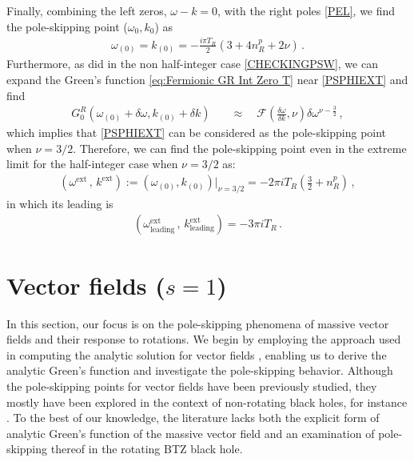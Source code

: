 \documentclass[11pt,a4paper]{article}
\begin{document}
Finally, combining the left zeros, $\omega-k=0$, with the right poles \eqref{PEL}, we find the pole-skipping point ($\omega_{0}, k_{0}$) as
\begin{align}\label{PSPHIEXT}
\omega_{(0)} = k_{(0)} = -\frac{i \pi T_R}{2} (3 + 4 n^{p}_{R} + 2\nu) \,.
\end{align}
Furthermore, as did in the non half-integer case \eqref{CHECKINGPSW}, we can expand the Green's function \eqref{eq:Fermionic GR Int Zero T} near \eqref{PSPHIEXT} and find
\begin{align}
G^R_0(\omega_{(0)} + \delta \omega, k_{(0)} + \delta k)  &\quad\approx\quad \mathcal{F}
\left(\frac{\delta \omega}{\delta k}, \nu\right)
\delta \omega^{\nu-\frac{3}{2}}  \,,
\end{align}
which implies that \eqref{PSPHIEXT} can be considered as the pole-skipping point when $\nu=3/2$.
Therefore, we can find the pole-skipping point even in the extreme limit for the half-integer case when $\nu=3/2$ as:
\begin{align}\label{answer111}
\left(\omega^{\text{ext}}\,,\, k^{\text{ext}}\right):= \left( \omega_{(0)}, k_{(0)} \right) \Big|_{\nu=3/2} = -2 \pi i T_R \left(\frac{3}{2}+n^p_R\right) \,,
\end{align}
in which its leading is 
\begin{align}\label{}
\left( \omega^{\text{ext}}_\text{leading}\,,\, k^{\text{ext}}_\text{leading} \right) = -3 \pi i T_R \,.
\end{align}









%    
\section{Vector fields ($s=1$)} \label{sec:Vector fields}
In this section, our focus is on the pole-skipping phenomena of massive vector fields and their response to rotations.
We begin by employing the approach used in computing the analytic solution for vector fields \cite{Das:1999pt, Birmingham:2001pj}, enabling us to derive the analytic Green's function and investigate the pole-skipping behavior. Although the pole-skipping points for vector fields have been previously studied, they mostly have been explored in the context of non-rotating black holes, for instance \cite{Natsuume:2019xcy}. To the best of our knowledge, the literature lacks both the explicit form of analytic Green's function of the massive vector field and an examination of pole-skipping thereof in the rotating BTZ black hole.
\end{document}
